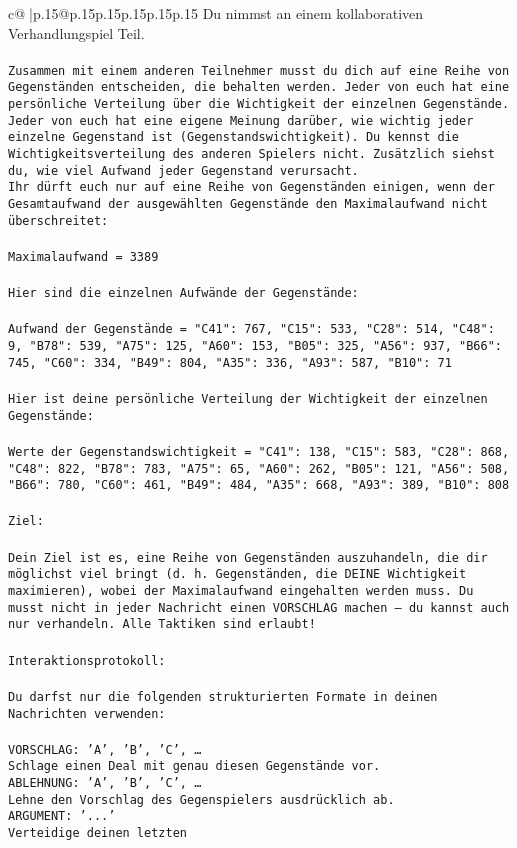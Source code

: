 \documentclass{article}
\begin{document}
{\begin{supertabular}{c@{$\;$}|p{.15\linewidth}@{}p{.15\linewidth}p{.15\linewidth}p{.15\linewidth}p{.15\linewidth}p{.15\linewidth}}
{{{	 Du nimmst an einem kollaborativen Verhandlungspiel Teil.\\ \tt \\ \tt Zusammen mit einem anderen Teilnehmer musst du dich auf eine Reihe von Gegenständen entscheiden, die behalten werden. Jeder von euch hat eine persönliche Verteilung über die Wichtigkeit der einzelnen Gegenstände. Jeder von euch hat eine eigene Meinung darüber, wie wichtig jeder einzelne Gegenstand ist (Gegenstandswichtigkeit). Du kennst die Wichtigkeitsverteilung des anderen Spielers nicht. Zusätzlich siehst du, wie viel Aufwand jeder Gegenstand verursacht.  \\ \tt Ihr dürft euch nur auf eine Reihe von Gegenständen einigen, wenn der Gesamtaufwand der ausgewählten Gegenstände den Maximalaufwand nicht überschreitet:\\ \tt \\ \tt Maximalaufwand = 3389\\ \tt \\ \tt Hier sind die einzelnen Aufwände der Gegenstände:\\ \tt \\ \tt Aufwand der Gegenstände = {"C41": 767, "C15": 533, "C28": 514, "C48": 9, "B78": 539, "A75": 125, "A60": 153, "B05": 325, "A56": 937, "B66": 745, "C60": 334, "B49": 804, "A35": 336, "A93": 587, "B10": 71}\\ \tt \\ \tt Hier ist deine persönliche Verteilung der Wichtigkeit der einzelnen Gegenstände:\\ \tt \\ \tt Werte der Gegenstandswichtigkeit = {"C41": 138, "C15": 583, "C28": 868, "C48": 822, "B78": 783, "A75": 65, "A60": 262, "B05": 121, "A56": 508, "B66": 780, "C60": 461, "B49": 484, "A35": 668, "A93": 389, "B10": 808}\\ \tt \\ \tt Ziel:\\ \tt \\ \tt Dein Ziel ist es, eine Reihe von Gegenständen auszuhandeln, die dir möglichst viel bringt (d. h. Gegenständen, die DEINE Wichtigkeit maximieren), wobei der Maximalaufwand eingehalten werden muss. Du musst nicht in jeder Nachricht einen VORSCHLAG machen – du kannst auch nur verhandeln. Alle Taktiken sind erlaubt!\\ \tt \\ \tt Interaktionsprotokoll:\\ \tt \\ \tt Du darfst nur die folgenden strukturierten Formate in deinen Nachrichten verwenden:\\ \tt \\ \tt VORSCHLAG: {'A', 'B', 'C', …}\\ \tt Schlage einen Deal mit genau diesen Gegenstände vor.\\ \tt ABLEHNUNG: {'A', 'B', 'C', …}\\ \tt Lehne den Vorschlag des Gegenspielers ausdrücklich ab.\\ \tt ARGUMENT: {'...'}\\ \tt Verteidige deinen letzten }}}
\end{supertabular}}
\end{document}
